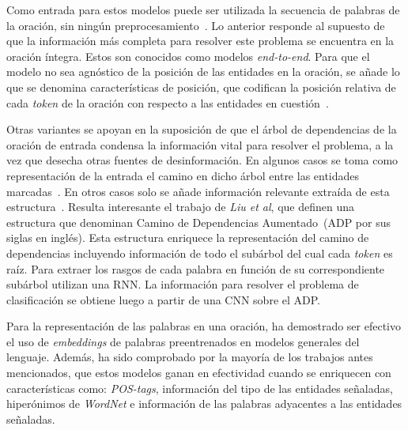 Como entrada para estos modelos puede ser utilizada la secuencia de palabras de la oración, sin ningún preprocesamiento~\cite{zeng2014relation, santos2015classifying, nguyen2015relation, huang2016attention, wang2016relation, xiao2016semantic}.
Lo anterior responde al supuesto de que la información más completa para resolver este problema se encuentra en la oración íntegra.
Estos son conocidos como modelos \textit{end-to-end}.
Para que el modelo no sea agnóstico de la posición de las entidades en la oración, se añade lo que se denomina características de posición, que codifican la posición relativa de cada \textit{token} de la oración con respecto a las entidades en cuestión~\cite{zeng2014relation, santos2015classifying, nguyen2015relation, zhang2015bidirectional,nguyen2015combining,huang2016attention, wang2016relation, xiao2016semantic, lee2019semantic}.

Otras variantes se apoyan en la suposición de que el árbol de dependencias de la oración de entrada condensa la información vital para resolver el problema, a la vez que desecha otras fuentes de desinformación.
En algunos casos se toma como representación de la entrada el camino en dicho árbol entre las entidades marcadas~\cite{socher2012semantic, xu2015classifying, hashimoto2015task, xu2015semantic, liu2015dependency, ebrahimi2015chain}.
En otros casos solo se añade información relevante extraída de esta estructura~\cite{zhang2015bidirectional}.
Resulta interesante el trabajo de \textit{Liu et al}, que definen una estructura que denominan Camino de Dependencias Aumentado~(ADP por sus siglas en inglés).
Esta estructura enriquece la representación del camino de dependencias incluyendo información de todo el subárbol del cual cada \textit{token} es raíz. 
Para extraer los rasgos de cada palabra en función de su correspondiente subárbol utilizan una RNN.
La información para resolver el problema de clasificación se obtiene luego a partir de una CNN sobre el ADP.

Para la representación de las palabras en una oración, ha demostrado ser efectivo el uso de \textit{embeddings} de palabras preentrenados en modelos generales del lenguaje.
Además, ha sido comprobado por la mayoría de los trabajos antes mencionados, que estos modelos ganan en efectividad cuando se enriquecen con características como: \textit{POS-tags}, información del tipo de las entidades señaladas, hiperónimos de \textit{WordNet} e información de las palabras adyacentes a las entidades señaladas.

